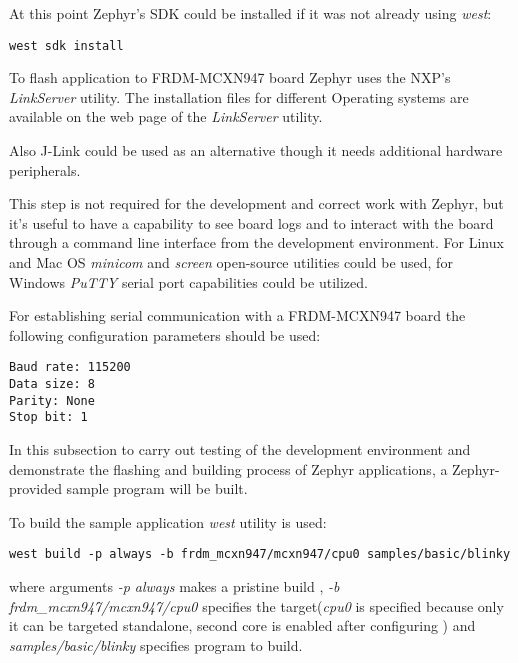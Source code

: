 \documentclass[twoside, 12pt]{article}
\begin{document}
At this point Zephyr's SDK could be installed if it was not already using \textit{west}: 
\begin{lstlisting}[caption=Installing Zephyr SDK using West]
west sdk install
\end{lstlisting}\label{west_sdk_install}

To flash application to FRDM-MCXN947 board Zephyr uses the NXP's \textit{LinkServer} utility.
The installation files for different Operating systems are available on the web page of the \textit{LinkServer} utility.\cite{link_server}

Also J-Link could be used as an alternative though it needs additional hardware peripherals.  \cite{zephyr_mcxn947}

This step is not required for the development and correct work with Zephyr, but it's useful 
to have a capability to see board logs and to interact with the board through a command line 
interface from the development environment. For Linux and Mac OS \textit{minicom}\cite{jayantilal_hc05} and 
\textit{screen}\cite{gnu_screen} open-source utilities could be used, for Windows \textit{PuTTY} serial port 
capabilities could be utilized. 

For establishing serial communication with a FRDM-MCXN947 board the following configuration parameters should be used\cite{mcxn947_getting_started}:
\begin{lstlisting}[caption=Serial port configuration]
Baud rate: 115200
Data size: 8
Parity: None
Stop bit: 1
\end{lstlisting}

In this subsection to carry out testing of the development environment and demonstrate the
flashing and building process of Zephyr applications, a Zephyr-provided sample program will 
be built.

To build the sample application \textit{west} utility is used:
\begin{lstlisting}[caption=Building the Blinky Program, breaklines=true]
west build -p always -b frdm_mcxn947/mcxn947/cpu0 samples/basic/blinky
\end{lstlisting}

where arguments \textit{-p always} makes a pristine build \cite{zehpyr_west_building}, 
\textit{-b frdm\_mcxn947/mcxn947/cpu0} specifies the target(\textit{cpu0} is specified 
because only it can be targeted standalone, second core is enabled after configuring 
\cite{zephyr_mcxn947}) and \textit{samples/basic/blinky} specifies program to build.
\end{document}
